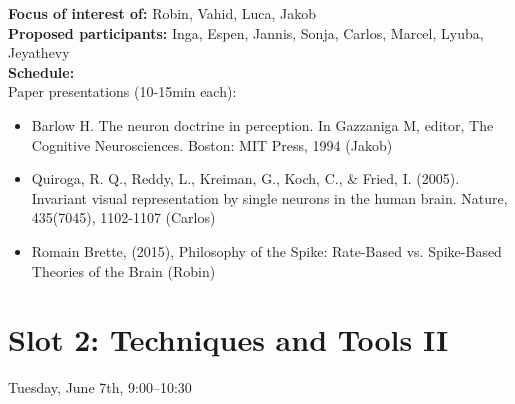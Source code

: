 \documentclass[10pt, a4paper,twoside,american]{article}
\begin{document}
\begin{enumerate}[resume]
  {\bf Focus of interest of:} Robin, Vahid, Luca, Jakob\\[1ex]
  {\bf Proposed participants:} Inga, Espen, Jannis, Sonja, Carlos, Marcel, Lyuba, Jeyathevy\\[1ex]
  {\bf Schedule:}\\[1ex]
  Paper presentations (10-15min each):
  \begin{itemize}
  \item Barlow H. The neuron doctrine in perception. In Gazzaniga M, editor, The Cognitive
    Neurosciences. Boston: MIT Press, 1994
    (Jakob)
  \item Quiroga, R. Q., Reddy, L., Kreiman, G., Koch, C., \& Fried, I. (2005). Invariant visual
    representation by single neurons in the human brain. Nature, 435(7045), 1102-1107 (Carlos)
  \item Romain Brette, (2015), Philosophy of the Spike: Rate-Based vs. Spike-Based Theories of the Brain (Robin)
  \end{itemize}
\end{enumerate}

\section*{Slot 2: Techniques and Tools II}
Tuesday, June 7th, 9:00--10:30
\end{document}
